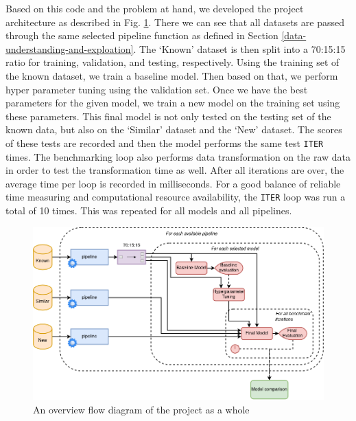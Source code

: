 Based on this code and the problem at hand, we developed the project architecture as described in Fig. \ref{fig:project-arch}. There we can see that all datasets are passed through the same selected pipeline function as defined in Section \ref{data-understanding-and-exploation}. The `Known' dataset is then split into a 70:15:15 ratio for training, validation, and testing, respectively. Using the training set of the known dataset, we train a baseline model. Then based on that, we perform hyper parameter tuning using the validation set. Once we have the best parameters for the given model, we train a new model on the training set using these parameters. This final model is not only tested on the testing set of the known data, but also on the `Similar' dataset and the `New' dataset. The scores of these tests are recorded and then the model performs the same test \lstinline{ITER} times. The benchmarking loop also performs data transformation on the raw data in order to test the transformation time as well. After all iterations are over, the average time per loop is recorded in milliseconds. For a good balance of reliable time measuring and computational resource availability, the \lstinline{ITER} loop was run a total of 10 times. This was repeated for all models and all pipelines.

\begin{figure}
    \centering
    \includegraphics[width=\linewidth]{figures/uploads/project_arch.png}
    \caption{An overview flow diagram of the project as a whole}
    \label{fig:project-arch}
\end{figure}

